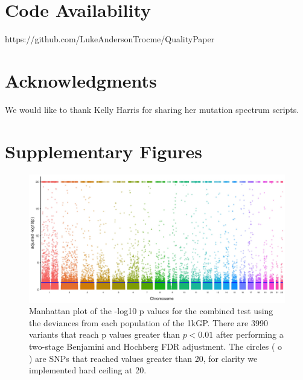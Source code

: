 \documentclass[9pt,lineno]{elife}
\begin{document}
\section{Code Availability}
https://github.com/LukeAndersonTrocme/QualityPaper

\section{Acknowledgments}
We would like to thank Kelly Harris for sharing her mutation spectrum scripts.



\clearpage
\section{Supplementary Figures}

\renewcommand{\thefigure}{S\arabic{figure}}
\setcounter{figure}{0}   	

\begin{figure}
\includegraphics[width=\hsize,keepaspectratio]{./Figures/ManhattanPlot_adjusted.jpg}

\caption{Manhattan plot of the -log10 p values for the combined test using the deviances from each population of the 1kGP. 
There are 3990 variants that reach p values greater than $ p < 0.01$ after performing a two-stage Benjamini and Hochberg FDR adjustment. 
The circles ( o ) are SNPs that reached values greater than 20, for clarity we implemented hard ceiling at 20.}
  \label{Manhattan}
\end{figure}
\end{document}
